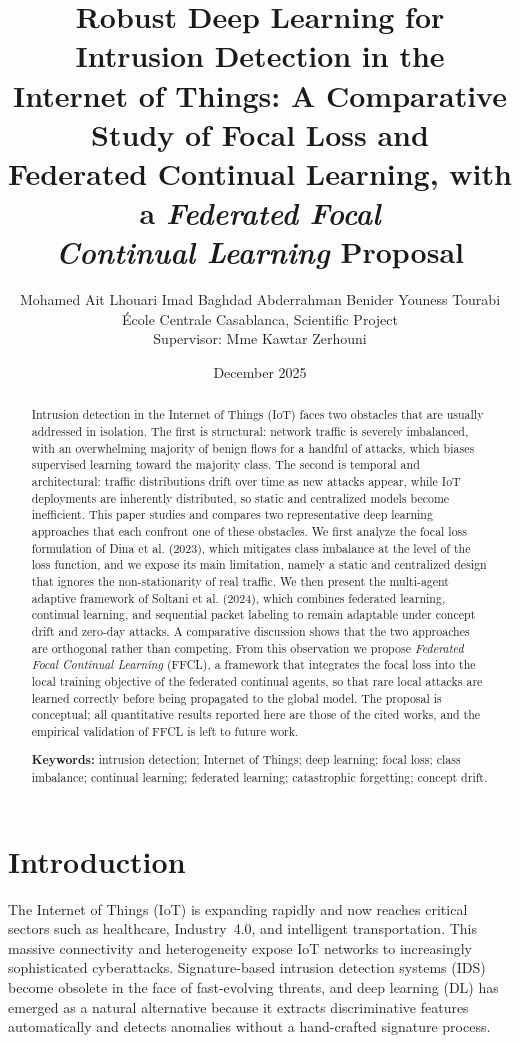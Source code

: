 \documentclass[11pt,a4paper]{article}
\title{\textbf{Robust Deep Learning for Intrusion Detection in the\\ Internet of Things: A Comparative Study of Focal Loss and\\ Federated Continual Learning, with a \emph{Federated Focal\\ Continual Learning} Proposal}}
\author{
Mohamed Ait Lhouari \quad Imad Baghdad \quad Abderrahman Benider \quad Youness Tourabi\\[4pt]
\normalsize École Centrale Casablanca, Scientific Project\\
\normalsize Supervisor: Mme Kawtar Zerhouni
}
\date{December 2025}
\begin{document}
\maketitle

\begin{abstract}
\noindent
Intrusion detection in the Internet of Things (IoT) faces two obstacles that are usually addressed in isolation. The first is structural: network traffic is severely imbalanced, with an overwhelming majority of benign flows for a handful of attacks, which biases supervised learning toward the majority class. The second is temporal and architectural: traffic distributions drift over time as new attacks appear, while IoT deployments are inherently distributed, so static and centralized models become inefficient. This paper studies and compares two representative deep learning approaches that each confront one of these obstacles. We first analyze the focal loss formulation of Dina et al. (2023), which mitigates class imbalance at the level of the loss function, and we expose its main limitation, namely a static and centralized design that ignores the non-stationarity of real traffic. We then present the multi-agent adaptive framework of Soltani et al. (2024), which combines federated learning, continual learning, and sequential packet labeling to remain adaptable under concept drift and zero-day attacks. A comparative discussion shows that the two approaches are orthogonal rather than competing. From this observation we propose \emph{Federated Focal Continual Learning} (FFCL), a framework that integrates the focal loss into the local training objective of the federated continual agents, so that rare local attacks are learned correctly before being propagated to the global model. The proposal is conceptual; all quantitative results reported here are those of the cited works, and the empirical validation of FFCL is left to future work.

\vspace{6pt}
\noindent\textbf{Keywords:} intrusion detection; Internet of Things; deep learning; focal loss; class imbalance; continual learning; federated learning; catastrophic forgetting; concept drift.
\end{abstract}

\section{Introduction}

The Internet of Things (IoT) is expanding rapidly and now reaches critical sectors such as healthcare, Industry~4.0, and intelligent transportation. This massive connectivity and heterogeneity expose IoT networks to increasingly sophisticated cyberattacks. Signature-based intrusion detection systems (IDS) become obsolete in the face of fast-evolving threats, and deep learning (DL) has emerged as a natural alternative because it extracts discriminative features automatically and detects anomalies without a hand-crafted signature process.
\end{document}
